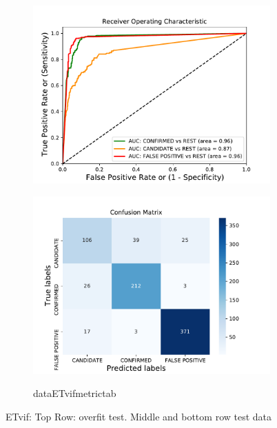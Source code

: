 \begin{figure}[H]
\begin{mdframed}[linecolor=green]
\begin{subfigure}{.49\textwidth}
                \includegraphics[width = 1\textwidth]{data/ET_vif_roc.pdf}
                \end{subfigure}
                \begin{subfigure}{.49\textwidth}
                \includegraphics[width = 1\textwidth]{data/ET_vif_cm.pdf}
                \end{subfigure}
                \begin{subfigure}{1\textwidth}
                \csname dataETvifmetrictab\endcsname
                \end{subfigure}
                \caption{ETvif: Top Row: overfit test. Middle and bottom row test data}
                \label{fig:data/ET_vif_roc}
                \end{mdframed}
                \end{figure}